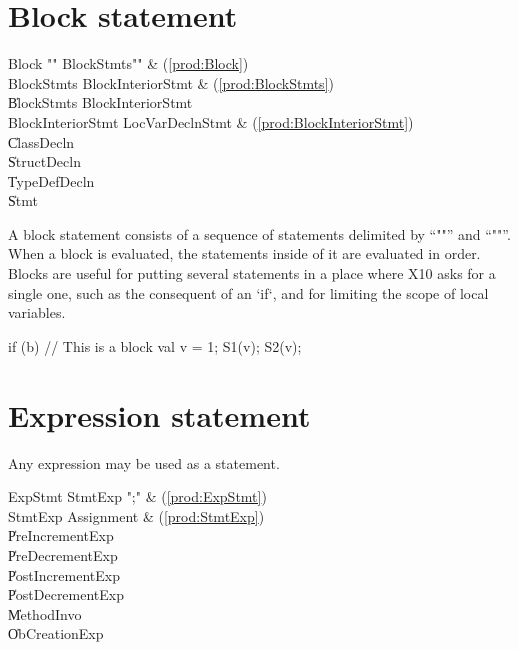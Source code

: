 \section{Block statement}
\label{Blocks}

\begin{bbgrammar}
               Block \: \xcd"{" BlockStmts\opt \xcd"}" & (\ref{prod:Block}) \\
          BlockStmts \: BlockInteriorStmt & (\ref{prod:BlockStmts}) \\
                     \| BlockStmts BlockInteriorStmt \\
   BlockInteriorStmt \: LocVarDeclnStmt & (\ref{prod:BlockInteriorStmt}) \\
                     \| ClassDecln \\
                     \| StructDecln \\
                     \| TypeDefDecln \\
                     \| Stmt \\
\end{bbgrammar}


A block statement consists of a sequence of statements delimited by
``\xcd"{"'' and ``\xcd"}"''. When a block is evaluated, the statements inside
of it are evaluated in order.  Blocks are useful for putting several
statements in a place where X10 asks for a single one, such as the consequent
of an \xcd`if`, and for limiting the scope of local variables.
\begin{xten}
if (b) {
  // This is a block
  val v = 1;
  S1(v); 
  S2(v);
}
\end{xten}



\section{Expression statement}

Any expression may be used as a statement.

\begin{bbgrammar}
             ExpStmt \: StmtExp \xcd";" & (\ref{prod:ExpStmt}) \\
             StmtExp \: Assignment & (\ref{prod:StmtExp}) \\
                     \| PreIncrementExp \\
                     \| PreDecrementExp \\
                     \| PostIncrementExp \\
                     \| PostDecrementExp \\
                     \| MethodInvo \\
                     \| ObCreationExp \\
\end{bbgrammar}

